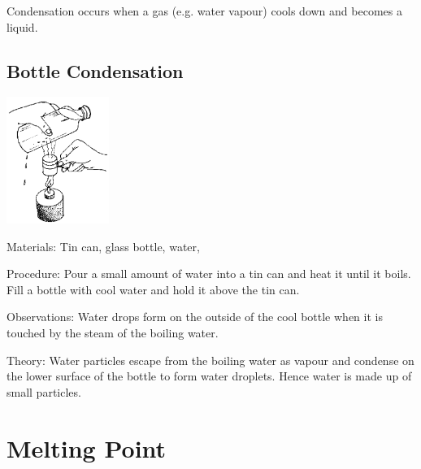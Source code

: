 \begin{multicols}{2}
Condensation occurs when a gas (e.g. water vapour) cools down and becomes a liquid.

\subsection{Bottle Condensation}

\begin{center}
\includegraphics[width=0.25\textwidth]{./img/source/change-state.png}
\end{center}

\begin{description*}
\item[Materials:]{Tin can, glass bottle, water, }
\item[Procedure:]{Pour a small amount of water into a tin can and heat it until it boils. Fill a bottle with cool water and hold it above the tin can.}
\item[Observations:]{Water drops form on the outside of the cool bottle when it is touched by the steam of the boiling water.}
\item[Theory:]{Water particles escape from the boiling water as vapour and condense on the lower surface of the bottle to form water droplets. Hence water is made up of small particles.}
\end{description*}

\columnbreak


\section*{Melting Point}



\end{multicols}
